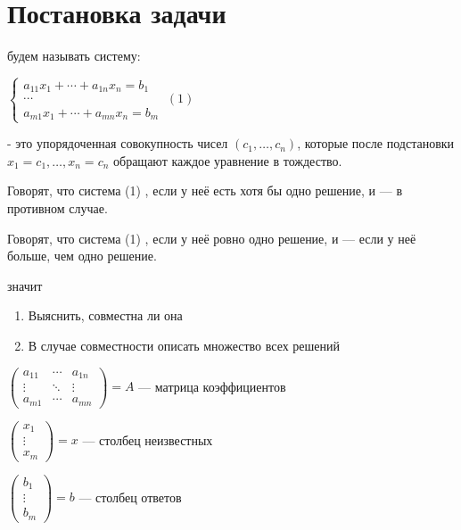 \chapter{Постановка задачи}
\begin{opred}
 будем называть систему:

$\begin{cases}
a_{11}x_1+\cdots+a_{1n}x_n=b_1 \\
\cdots \\
a_{m1}x_1+\cdots+a_{mn}x_n=b_m
\end{cases}\ (1)$
\end{opred}
\begin{opred}
 - это упорядоченная совокупность чисел $(c_1,\ldots,c_n)$, которые после подстановки $x_1=c_1,\ldots,x_n=c_n$ обращают каждое уравнение в тождество.
\end{opred}
\begin{opred}
Говорят, что система (1) , если у неё есть хотя бы одно решение, и  --- в противном случае.
\end{opred}
\begin{opred}
Говорят, что система (1) , если у неё ровно одно решение, и  --- если у неё больше, чем одно решение.
\end{opred}
\begin{opred}
 значит
\begin{enumerate}
\item Выяснить, совместна ли она
\item В случае совместности описать множество всех решений
\end{enumerate}
\end{opred}
$\begin{pmatrix}
a_{11} & \cdots & a_{1n} \\
\vdots & \ddots & \vdots \\
a_{m1} & \cdots & a_{mn}
\end{pmatrix}=A$ --- матрица коэффициентов

$\begin{pmatrix}
x_1    \\
\vdots \\
x_m
\end{pmatrix}=x$ --- столбец неизвестных

$\begin{pmatrix}
b_1    \\
\vdots \\
b_m
\end{pmatrix}=b$ --- столбец ответов

